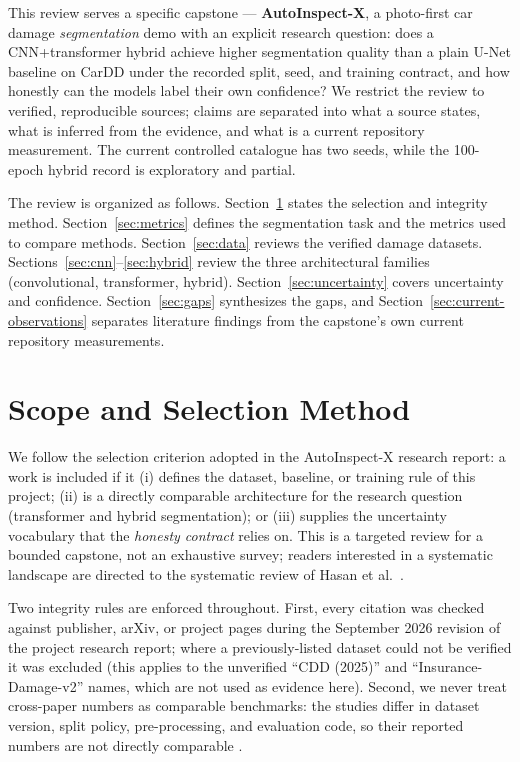 \documentclass[conference]{IEEEtran}
\begin{document}
This review serves a specific capstone --- \textbf{AutoInspect-X}, a photo-first
car damage \emph{segmentation} demo with an explicit research question: does a
CNN+transformer hybrid achieve higher segmentation quality than a plain U-Net
baseline on CarDD under the recorded split, seed, and training contract, and how
honestly can the models label their own confidence? We restrict the review to
verified, reproducible sources; claims are separated into what a source states,
what is inferred from the evidence, and what is a current repository
measurement. The current controlled catalogue has two seeds, while the
100-epoch hybrid record is exploratory and partial.

The review is organized as follows. Section~\ref{sec:scope} states the selection
and integrity method. Section~\ref{sec:metrics} defines the segmentation task and
the metrics used to compare methods. Section~\ref{sec:data} reviews the verified
damage datasets. Sections~\ref{sec:cnn}--\ref{sec:hybrid} review the three
architectural families (convolutional, transformer, hybrid). Section~\ref{sec:uncertainty}
covers uncertainty and confidence. Section~\ref{sec:gaps} synthesizes the gaps,
and Section~\ref{sec:current-observations} separates literature findings from the
capstone's own current repository measurements.

\section{Scope and Selection Method}
\label{sec:scope}
We follow the selection criterion adopted in the AutoInspect-X research report:
a work is included if it (i) defines the dataset, baseline, or training rule of
this project; (ii) is a directly comparable architecture for the research
question (transformer and hybrid segmentation); or (iii) supplies the
uncertainty vocabulary that the \emph{honesty contract} relies on. This is a
targeted review for a bounded capstone, not an exhaustive survey; readers
interested in a systematic landscape are directed to the systematic review of
Hasan et al.~\cite{hasan2025}.

Two integrity rules are enforced throughout. First, every citation was checked
against publisher, arXiv, or project pages during the September 2026 revision of
the project research report; where a previously-listed dataset could not be
verified it was excluded (this applies to the unverified ``CDD (2025)'' and
``Insurance-Damage-v2'' names, which are not used as evidence here). Second, we
never treat cross-paper numbers as comparable benchmarks: the studies differ in
dataset version, split policy, pre-processing, and evaluation code, so their
reported numbers are not directly comparable \cite{cardd2023,hasan2025}.
\end{document}
